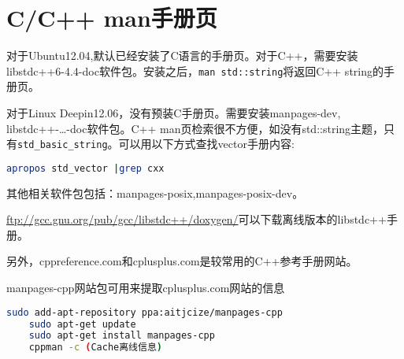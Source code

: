 \section{C/C++ man手册页}
对于Ubuntu12.04,默认已经安装了C语言的手册页。对于C++，需要安装libstdc++6-4.4-doc软件包。安装之后，\verb+man std::string+将返回C++ string的手册页。


对于Linux Deepin12.06，没有预装C手册页。需要安装manpages-dev, libstdc++-\ldots-doc软件包。C++ man页检索很不方便，如没有std::string主题，只有\verb+std_basic_string+。可以用以下方式查找vector手册内容:
\begin{lstlisting}[language=bash]
	apropos std_vector |grep cxx
\end{lstlisting}

其他相关软件包包括：manpages-posix,manpages-posix-dev。

\url{ftp://gcc.gnu.org/pub/gcc/libstdc++/doxygen/}可以下载离线版本的libstdc++手册。

另外，cppreference.com和cplusplus.com是较常用的C++参考手册网站。

manpages-cpp网站包可用来提取cplusplus.com网站的信息
\begin{lstlisting}[language=bash]
	sudo add-apt-repository ppa:aitjcize/manpages-cpp
	sudo apt-get update
	sudo apt-get install manpages-cpp
	cppman -c (Cache离线信息)
\end{lstlisting}


